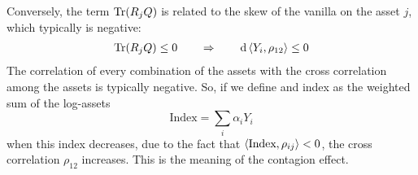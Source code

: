 Conversely, the term $\Tr(R_jQ)$ is related to the skew of the vanilla on the asset $j$, which typically is negative:
\begin{align*}
    \Tr(R_jQ) \le 0 \qquad\Rightarrow\qquad \dd\expval{Y_i,\rho_{12}} \le 0
\end{align*}
The correlation of every combination of the assets with the cross correlation among the assets is typically negative. So, if we define and index as the weighted sum of the log-assets
\begin{equation*}
    \text{Index} = \sum_i \alpha_iY_i
\end{equation*}
when this index decreases, due to the fact that $\expval{\text{Index},\rho_{ij}}<0$, the cross correlation $\rho_{12}$ increases. This is the meaning of the contagion effect.
